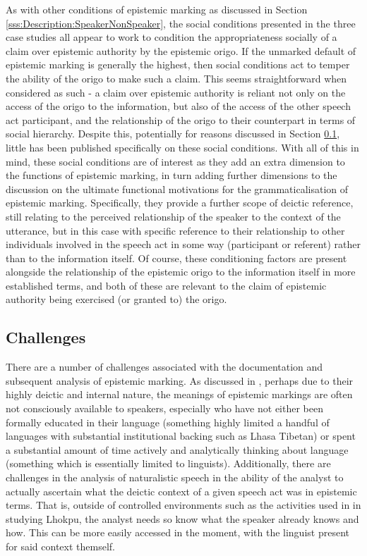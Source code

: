 As with other conditions of epistemic marking as discussed in Section \ref{sss:Description:SpeakerNonSpeaker}, the social conditions presented in the three case studies all appear to work to condition the appropriateness socially of a claim over epistemic authority by the epistemic origo. If the unmarked default of epistemic marking is generally the highest, then social conditions act to temper the ability of the origo to make such a claim. This seems straightforward when considered as such - a claim over epistemic authority is reliant not only on the access of the origo to the information, but also of the access of the other speech act participant, and the relationship of the origo to their counterpart in terms of social hierarchy. Despite this, potentially for reasons discussed in Section \ref{ss:Discussion:SocialChallenges}, little has been published specifically on these social conditions. With all of this in mind, these social conditions are of interest as they add an extra dimension to the functions of epistemic marking, in turn adding further dimensions to the discussion on the ultimate functional motivations for the grammaticalisation of epistemic marking. Specifically, they provide a further scope of deictic reference, still relating to the perceived relationship of the speaker to the context of the utterance, but in this case with specific reference to their relationship to other individuals involved in the speech act in some way (participant or referent) rather than to the information itself. Of course, these conditioning factors are present alongside the relationship of the epistemic origo to the information itself in more established terms, and both of these are relevant to the claim of epistemic authority being exercised (or granted to) the origo.

\subsection{Challenges}\label{ss:Discussion:SocialChallenges}
There are a number of challenges associated with the documentation and subsequent analysis of epistemic marking. As discussed in , perhaps due to their highly deictic and internal nature, the meanings of epistemic markings are often not consciously available to speakers, especially who have not either been formally educated in their language (something highly limited a handful of languages with substantial institutional backing such as Lhasa Tibetan) or spent a substantial amount of time actively and analytically thinking about language (something which is essentially limited to linguists). Additionally, there are challenges in the analysis of naturalistic speech in the ability of the analyst to actually ascertain what the deictic context of a given speech act was in epistemic terms. That is, outside of controlled environments such as the activities used in  in studying Lhokpu, the analyst needs so know what the speaker already knows and how. This can be more easily accessed in the moment, with the linguist present for said context themself.

